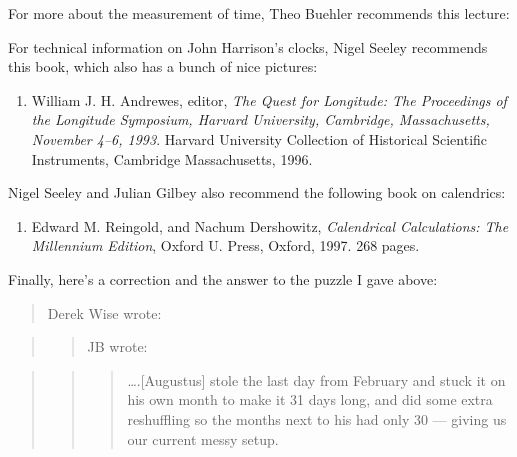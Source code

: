 \documentclass{article}
\def\tightlist{}
\renewcommand{\texttt}[1]{%
  \begingroup
  \ttfamily
  \begingroup\lccode`~=`/\lowercase{\endgroup\def~}{/\discretionary{}{}{}}%
  \begingroup\lccode`~=`[\lowercase{\endgroup\def~}{[\discretionary{}{}{}}%
  \begingroup\lccode`~=`.\lowercase{\endgroup\def~}{.\discretionary{}{}{}}%
  \catcode`/=\active\catcode`[=\active\catcode`.=\active
  \scantokens{#1\noexpand}%
  \endgroup
}
\begin{document}
For more about the measurement of time, Theo Buehler recommends this
lecture:


For technical information on John Harrison's clocks, Nigel Seeley
recommends this book, which also has a bunch of nice pictures:

\begin{enumerate}
\def\labelenumi{\arabic{enumi})}
\setcounter{enumi}{11}
\tightlist
\item
  William J. H. Andrewes, editor, \emph{The Quest for Longitude: The
  Proceedings of the Longitude Symposium, Harvard University, Cambridge,
  Massachusetts, November 4--6, 1993}. Harvard University Collection of
  Historical Scientific Instruments, Cambridge Massachusetts, 1996.
\end{enumerate}

Nigel Seeley and Julian Gilbey also recommend the following book on
calendrics:

\begin{enumerate}
\def\labelenumi{\arabic{enumi})}
\setcounter{enumi}{12}
\tightlist
\item
  Edward M. Reingold, and Nachum Dershowitz, \emph{Calendrical
  Calculations: The Millennium Edition}, Oxford U. Press, Oxford, 1997.
  268 pages.
\end{enumerate}

Finally, here's a correction and the answer to the puzzle I gave above:

\begin{quote}
Derek Wise wrote:
\end{quote}

\begin{quote}
\begin{quote}
JB wrote:
\end{quote}
\end{quote}

\begin{quote}
\begin{quote}
\begin{quote}
\ldots.{[}Augustus{]} stole the last day from February and stuck it on
his own month to make it 31 days long, and did some extra reshuffling so
the months next to his had only 30 --- giving us our current messy
setup.
\end{quote}
\end{quote}
\end{quote}
\end{document}
